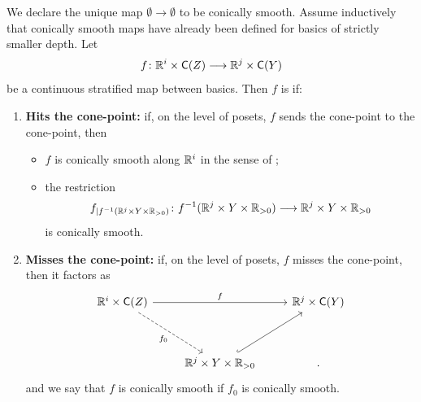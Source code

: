\begin{definition}\cite[Definition~3.3.1]{AFT1}
    \label{ch4:: def: conically smooth map}
    We declare the unique map $\emptyset \to \emptyset$ to be conically smooth. Assume inductively that conically smooth maps have already been defined for basics of strictly smaller depth. Let
    \begin{equation}
        f \colon \mathbb R^{i}\times \mathsf C(Z) \longrightarrow \mathbb R^{j}\times \mathsf C(Y)
    \end{equation}
    be a continuous stratified map between basics. Then $f$ is  if:
    \begin{enumerate}
        \item \textbf{Hits the cone-point:} if, on the level of posets, $f$ sends the cone-point to the cone-point, then
        \begin{itemize}
            \item $f$ is conically smooth along $\mathbb R^{i}$ in the sense of ;
            \item the restriction
            \begin{equation}
                f_{|f^{-1}(\mathbb R^{j}\times Y \times \mathbb R_{>0})} \colon f^{-1}(\mathbb R^{j}\times Y \times \mathbb R_{>0}) \longrightarrow \mathbb R^{j}\times Y \times \mathbb R_{>0}
            \end{equation}
            is conically smooth.
        \end{itemize}
        \item \textbf{Misses the cone-point:} if, on the level of posets, $f$ misses the cone-point, then it factors as
        \begin{equation}
            \begin{tikzcd}[ampersand replacement=\&]
                {\RR^{i}\times \sC(Z)} \&\& {\RR^{j}\times \sC(Y)} \\
                \\
                \& {\RR^{j}\times Y \times \RR_{>0}} \& {.}
                \arrow["f", from=1-1, to=1-3]
                \arrow["{f_0}"', dashed, from=1-1, to=3-2]
                \arrow[hook, from=3-2, to=1-3]
            \end{tikzcd}
        \end{equation}
        and we say that $f$ is conically smooth if $f_0$ is conically smooth.
    \end{enumerate}
\end{definition}

